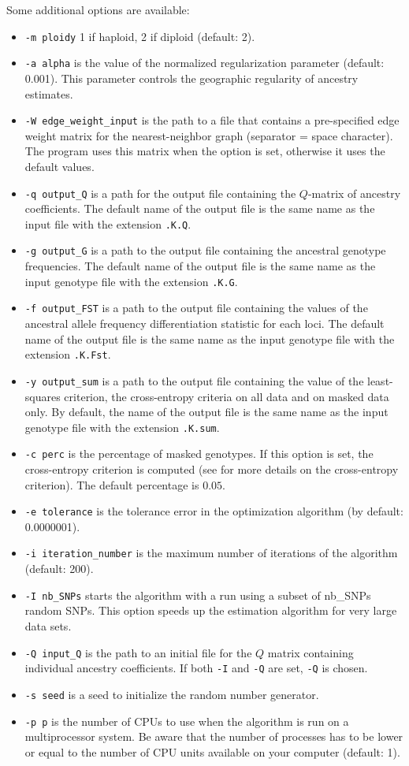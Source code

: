 \documentclass[10pt,a4paper]{article}
\begin{document}
\noindent
Some additional options are available:
\begin{itemize}
\item \verb|-m ploidy|  1 if haploid, 2 if diploid (default: 2). 
\item \verb|-a alpha| is the value of the normalized regularization parameter 
(default: 0.001). This parameter controls the geographic regularity of ancestry 
estimates.
\item \verb|-W edge_weight_input| is the path to a file that contains a 
pre-specified edge weight matrix for the nearest-neighbor graph (separator = 
space character). The program uses this matrix when the option is set, otherwise 
it uses the default values.
\item \verb|-q output_Q| is a path for the output file containing the $Q$-matrix 
of ancestry coefficients. The default name of the output file is the same name 
as the input file with the extension {\tt .K.Q}.
\item \verb|-g output_G| is a path to the output file containing the ancestral 
genotype frequencies. The default name of the output file is the same name as 
the input genotype file with the extension {\tt .K.G}.
\item \verb|-f output_FST| is a path to the output file containing the values of 
the ancestral allele frequency differentiation statistic for each loci. The 
default name of the output file is the same name as the input genotype file with 
the extension {\tt .K.Fst}.
\item \verb|-y output_sum| is a path to the output file containing the value of 
the least-squares criterion, the cross-entropy criteria on all data and on 
masked data only. By default, the name of the output file is the same name as 
the input genotype file with the extension {\tt .K.sum}.
\item \verb|-c perc| is the percentage of masked genotypes. If this option is 
set, the cross-entropy criterion is computed (see\cite{frichot2014fast} for more 
details on the cross-entropy criterion). The default percentage is $0.05$.
\item \verb|-e tolerance| is the tolerance error in the optimization algorithm 
(by default: 0.0000001). 
\item \verb|-i iteration_number| is the maximum number of iterations of the 
algorithm (default: 200). 
\item \verb|-I nb_SNPs| starts the algorithm with a run using a subset of 
nb\_SNPs random SNPs. This option speeds up the estimation algorithm for very 
large data sets.
\item \verb|-Q input_Q| is the path to an initial file for the $Q$ matrix 
containing individual ancestry coefficients. If both \verb|-I| and \verb|-Q| are 
set, \verb|-Q| is chosen.
\item \verb|-s seed| is a seed to initialize the random number generator. 
\item \verb|-p p| is the number of CPUs to use when the algorithm is run on a 
multiprocessor system.
Be aware that the number of processes has to be lower or equal to the number of 
CPU units available on your computer (default: 1).

\end{itemize}
\end{document}
